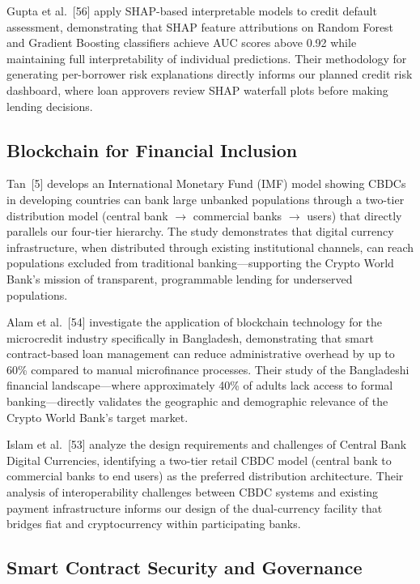 \documentclass[12pt,a4paper]{report}
\begin{document}
Gupta et al.~[56] apply SHAP-based interpretable models to credit default assessment, demonstrating that SHAP feature attributions on Random Forest and Gradient Boosting classifiers achieve AUC scores above 0.92 while maintaining full interpretability of individual predictions. Their methodology for generating per-borrower risk explanations directly informs our planned credit risk dashboard, where loan approvers review SHAP waterfall plots before making lending decisions.

\subsection{Blockchain for Financial Inclusion}

Tan~[5] develops an International Monetary Fund (IMF) model showing CBDCs in developing countries can bank large unbanked populations through a two-tier distribution model (central bank $\to$ commercial banks $\to$ users) that directly parallels our four-tier hierarchy. The study demonstrates that digital currency infrastructure, when distributed through existing institutional channels, can reach populations excluded from traditional banking---supporting the Crypto World Bank's mission of transparent, programmable lending for underserved populations.

Alam et al.~[54] investigate the application of blockchain technology for the microcredit industry specifically in Bangladesh, demonstrating that smart contract-based loan management can reduce administrative overhead by up to 60\% compared to manual microfinance processes. Their study of the Bangladeshi financial landscape---where approximately 40\% of adults lack access to formal banking---directly validates the geographic and demographic relevance of the Crypto World Bank's target market.

Islam et al.~[53] analyze the design requirements and challenges of Central Bank Digital Currencies, identifying a two-tier retail CBDC model (central bank to commercial banks to end users) as the preferred distribution architecture. Their analysis of interoperability challenges between CBDC systems and existing payment infrastructure informs our design of the dual-currency facility that bridges fiat and cryptocurrency within participating banks.

\subsection{Smart Contract Security and Governance}
\end{document}

